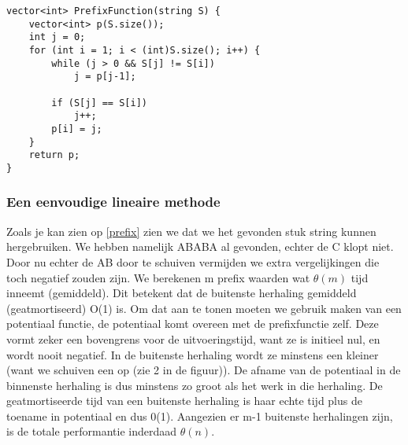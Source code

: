 \begin{lstlisting}
vector<int> PrefixFunction(string S) {
    vector<int> p(S.size());
    int j = 0;
    for (int i = 1; i < (int)S.size(); i++) {
        while (j > 0 && S[j] != S[i])
            j = p[j-1];

        if (S[j] == S[i])
            j++;
        p[i] = j;
    }   
    return p;
}
\end{lstlisting}
\clearpage
\subsubsection{Een eenvoudige lineaire methode}
Zoals je kan zien op \ref{prefix} zien we dat we het gevonden stuk string kunnen hergebruiken. We hebben namelijk ABABA al gevonden, echter de C klopt niet. Door nu echter de AB door te schuiven vermijden we extra vergelijkingen die toch negatief zouden zijn.
\npar
We berekenen m prefix waarden wat $\theta(m)$ tijd inneemt (gemiddeld). Dit betekent dat de buitenste herhaling gemiddeld (geatmortiseerd) O(1) is. Om dat aan te tonen moeten we gebruik maken van een potentiaal functie, de potentiaal komt overeen met de prefixfunctie zelf. 
Deze vormt zeker een bovengrens voor de uitvoeringstijd, want ze is initieel nul, en wordt nooit negatief. In de buitenste herhaling wordt ze minstens een kleiner (want we schuiven een op (zie 2 in de figuur)).
\npar
De afname van de potentiaal in de binnenste herhaling is dus minstens zo groot als het werk in die herhaling. De geatmortiseerde tijd van een buitenste herhaling is haar echte tijd plus de toename in potentiaal en dus 0(1). Aangezien er m-1 buitenste herhalingen zijn, is de totale performantie inderdaad $\theta(n)$.
\clearpage
